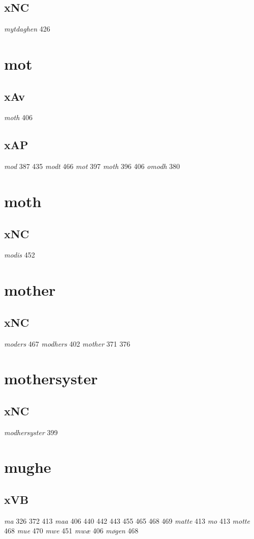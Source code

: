\documentclass[a4paper,twocolumn]{article}
\begin{document}
\subsection{xNC}
\label{sec:org0fe160c}
\emph{mytdaghen} 426 
\section{mot}
\label{sec:org8aef26a}
\subsection{xAv}
\label{sec:org2b13f5a}
\emph{moth} 406 
\subsection{xAP}
\label{sec:org4e9070b}
\emph{mod} 387 435 \emph{modt} 466 \emph{mot} 397 \emph{moth} 396 406 \emph{omodh} 380 
\section{moth}
\label{sec:org86656a8}
\subsection{xNC}
\label{sec:org0b441db}
\emph{modis} 452 
\section{mother}
\label{sec:orga7ba2b4}
\subsection{xNC}
\label{sec:orgf4af1aa}
\emph{moders} 467 \emph{modhers} 402 \emph{mother} 371 376 
\section{mothersyster}
\label{sec:org99ab7db}
\subsection{xNC}
\label{sec:org66f7e87}
\emph{modhersyster} 399 
\section{mughe}
\label{sec:org00b481a}
\subsection{xVB}
\label{sec:org3b628fd}
\emph{ma} 326 372 413 \emph{maa} 406 440 442 443 455 465 468 469 \emph{matte} 413 \emph{mo} 413 \emph{motte} 468 \emph{mue} 470 \emph{mwe} 451 \emph{mwæ} 406 \emph{møgen} 468 
\end{document}
